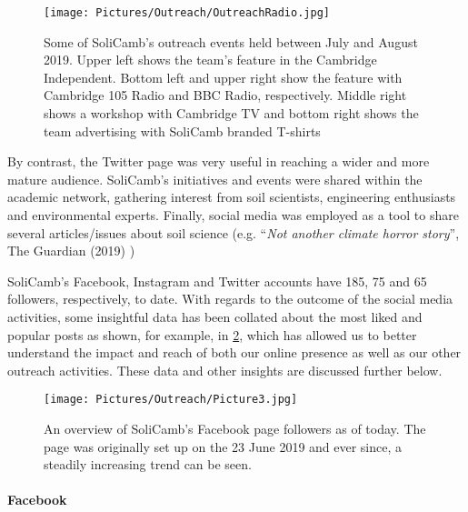        
          \begin{figure}[ht]
    	\centering
    	\texttt{[image: Pictures/Outreach/OutreachRadio.jpg]}
    	\captionsetup{justification = centering}
    	\caption{ Some of SoliCamb's outreach events held between July and August 2019. Upper left shows the team's feature in the Cambridge Independent. Bottom left and upper right show the feature with Cambridge 105 Radio and BBC Radio, respectively. Middle right shows a workshop with Cambridge TV and bottom right shows the team advertising with SoliCamb branded T-shirts}
    	\label{fig:OutreachRadio}
     \end{figure}
       
       
       By contrast, the Twitter page was very useful in reaching a wider and more mature audience.  SoliCamb's initiatives and events were shared within the academic network, gathering interest from soil scientists, engineering enthusiasts and environmental experts. Finally, social media was employed as a tool to share several articles/issues about soil science (e.g. \enquote{\textit{Not another climate horror story}}, The Guardian (2019) \cite{guardian}) 
       
SoliCamb's Facebook, Instagram and Twitter accounts have 185, 75 and 65 followers, respectively, to date.  With regards to the outcome of the social media activities, some insightful data has been collated about the most liked and popular posts as shown, for example, in \cref{fig:FbFollowers}, which has allowed us to better understand the impact and reach of both our online presence as well as our other outreach activities. These data and other insights are discussed further below. 
      
          \begin{figure}[ht]
    	\centering
    	\texttt{[image: Pictures/Outreach/Picture3.jpg]}
    	\captionsetup{justification = centering}
    	\caption{An overview of SoliCamb's Facebook page followers as of today. The page was originally set up on the 23 June 2019 and ever since, a steadily increasing trend can be seen.}
    	\label{fig:FbFollowers}
     \end{figure}
     
\paragraph{Facebook}

